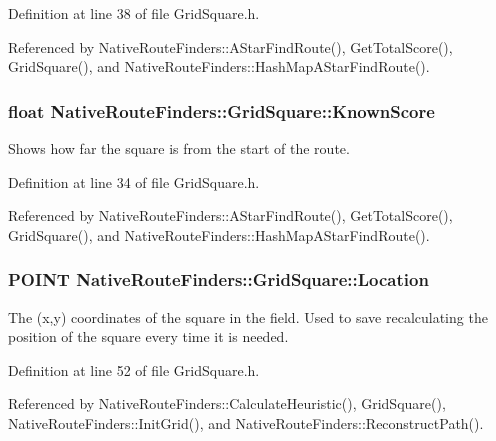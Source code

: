 Definition at line 38 of file Grid\-Square.\-h.



Referenced by Native\-Route\-Finders\-::\-A\-Star\-Find\-Route(), Get\-Total\-Score(), Grid\-Square(), and Native\-Route\-Finders\-::\-Hash\-Map\-A\-Star\-Find\-Route().

\hypertarget{class_native_route_finders_1_1_grid_square_abcfebccecea6a8ddda2ded4361a94412}{
\subsubsection[{Known\-Score}]{\setlength{\rightskip}{0pt plus 5cm}float {\bf Native\-Route\-Finders\-::\-Grid\-Square\-::\-Known\-Score}}}\label{class_native_route_finders_1_1_grid_square_abcfebccecea6a8ddda2ded4361a94412}
Shows how far the square is from the start of the route. 

Definition at line 34 of file Grid\-Square.\-h.



Referenced by Native\-Route\-Finders\-::\-A\-Star\-Find\-Route(), Get\-Total\-Score(), Grid\-Square(), and Native\-Route\-Finders\-::\-Hash\-Map\-A\-Star\-Find\-Route().

\hypertarget{class_native_route_finders_1_1_grid_square_a2e55684426636e77203e495c0dd89505}{
\subsubsection[{Location}]{\setlength{\rightskip}{0pt plus 5cm}P\-O\-I\-N\-T {\bf Native\-Route\-Finders\-::\-Grid\-Square\-::\-Location}}}\label{class_native_route_finders_1_1_grid_square_a2e55684426636e77203e495c0dd89505}
The (x,y) coordinates of the square in the field. Used to save recalculating the position of the square every time it is needed. 

Definition at line 52 of file Grid\-Square.\-h.



Referenced by Native\-Route\-Finders\-::\-Calculate\-Heuristic(), Grid\-Square(), Native\-Route\-Finders\-::\-Init\-Grid(), and Native\-Route\-Finders\-::\-Reconstruct\-Path().

